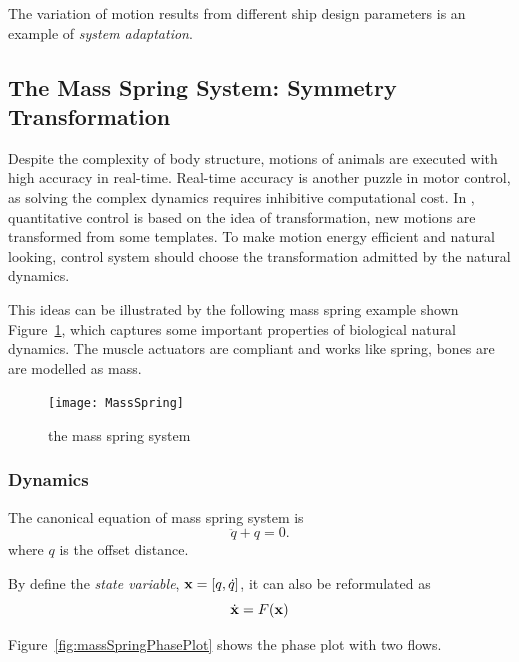The variation of motion results from different ship design parameters is an example of \emph{system adaptation}.


\subsection{The Mass Spring System:  Symmetry Transformation}
Despite the complexity of body structure, motions of animals are executed with high accuracy in real-time.
Real-time accuracy is another puzzle in motor control, as solving the complex dynamics requires inhibitive computational cost.
In \moit, quantitative control is based on the idea of transformation, new motions are transformed from some templates.
To make motion energy efficient and natural looking, control system should choose the transformation admitted by the natural dynamics.

This ideas can be illustrated by the following mass spring example shown Figure~\ref{fig:massspring}, which captures some important properties of biological natural dynamics.
The muscle actuators are compliant and works like spring,  bones are are modelled as mass.

\begin{figure}[!htbp]
  \begin{center}
    \texttt{[image: MassSpring]}
    \caption{the mass spring system}
    \label{fig:massspring}
  \end{center}
\end{figure}

\subsubsection*{Dynamics}
The canonical equation of mass spring system is
\begin{equation}
\label{eq:mass-spring}
\ddot{q}+q=0.
\end{equation}
where $q$ is the offset distance.

By define the \emph{state variable}, $\mathbf{x}=[q,\dot{q}]$, it can also be reformulated as
\[
\dot{\mathbf{x}}=F(\mathbf{x})
\]

 Figure~\ref{fig:massSpringPhasePlot} shows the phase plot with two flows.


